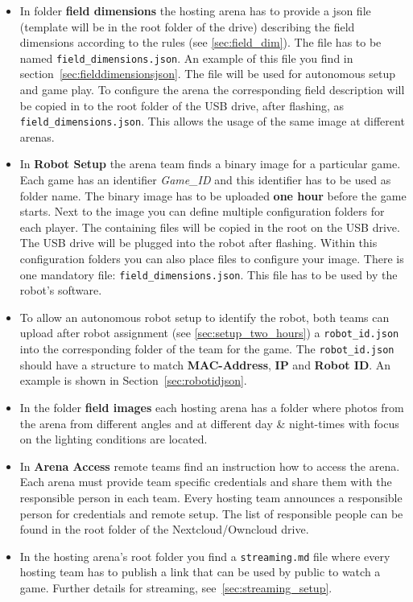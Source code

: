 \begin{itemize}
    \item In folder \textbf{field dimensions} the hosting arena has to provide a json file (template will be in the root folder of the drive) describing the field dimensions according to the rules (see \ref{sec:field_dim}). The file has to be named \texttt{field\_dimensions.json}. An example of this file you find in section~\ref{sec:fielddimensionsjson}. The file will be used for autonomous setup and game play. To configure the arena the corresponding field description will be copied in to the root folder of the USB drive, after flashing, as \texttt{field\_dimensions.json}. This allows the usage of the same image at different arenas.
    \item In \textbf{Robot Setup} the arena team finds a binary image for a particular game. Each game has an identifier \textit{Game\_ID} and this identifier has to be used as folder name. The binary image has to be uploaded \textbf{one hour} before the game starts. Next to the image you can define multiple configuration folders for each player. The containing files will be copied in the root on the USB drive. The USB drive will be plugged into the robot after flashing. Within this configuration folders you can also place files to configure your image. There is one mandatory file: \texttt{field\_dimensions.json}. This file has to be used by the robot's software.
    \item To allow an autonomous robot setup to identify the robot, both teams can upload after robot assignment (see \ref{sec:setup_two_hours}) a \texttt{robot\_id.json} into the corresponding folder of the team for the game. The \texttt{robot\_id.json} should have a structure to match \textbf{MAC-Address}, \textbf{IP} and \textbf{Robot ID}. An example is shown in Section~\ref{sec:robotidjson}.
    \item In the folder \textbf{field images} each hosting arena has a folder where photos from the arena from different angles and at different day \& night-times with focus on the lighting conditions are located.
    \item In \textbf{Arena Access} remote teams find an instruction how to access the arena. Each arena must provide team specific credentials and share them with the responsible person in each team. Every hosting team announces a responsible person for credentials and remote setup. The list of responsible people can be found in the root folder of the Nextcloud/Owncloud drive.
    \item In the hosting arena's root folder you find a \texttt{streaming.md} file where every hosting team has to publish a link that can be used by public to watch a game. Further details for streaming, see~\ref{sec:streaming_setup}.

\end{itemize}
